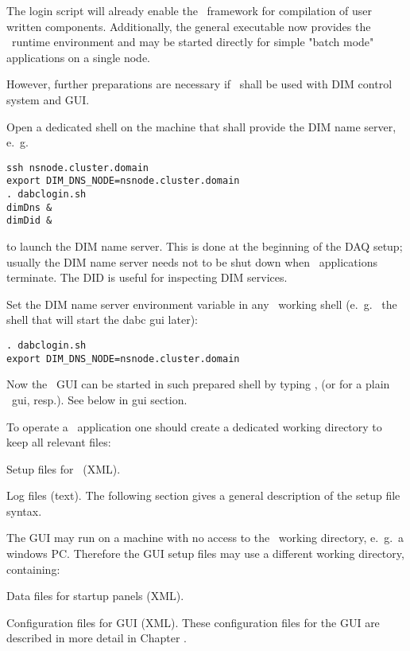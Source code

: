 The login script will already enable the \dabc\ framework for
compilation of user written components. Additionally, 
the general executable  now provides
the \dabc\ runtime environment and may be started directly 
for simple "batch mode" applications on a single node. 

However, further preparations are necessary if \dabc\ shall be used with
DIM control system and GUI.

\item Open a dedicated shell on the machine that shall provide the DIM name server,
e.~g.~ 
\begin{small}
\begin{verbatim}
ssh nsnode.cluster.domain
export DIM_DNS_NODE=nsnode.cluster.domain
. dabclogin.sh
dimDns &
dimDid &
\end{verbatim} 
\end{small}
to launch the DIM name server. This is done  at the beginning of
the DAQ setup; usually the DIM name server needs not to be shut down 
when \dabc\ applications terminate. The DID is useful for inspecting DIM services.

\item Set the DIM name server environment variable in any \dabc\ working shell (e.~g.~
the shell that will start the dabc gui later):
\begin{small}
\begin{verbatim}
. dabclogin.sh
export DIM_DNS_NODE=nsnode.cluster.domain
\end{verbatim} 
\end{small}

\item Now the \dabc\ GUI can be started in such prepared shell by typing , (or 
 for a plain \mbs\ gui, resp.). See below in gui section.  

\enum

\medskip
To operate a \dabc\ application one should create a dedicated 
working directory to keep all relevant files:
\bbul
\item Setup files for \dabc\ (XML).
\item Log files (text).
\ebul
The following section  
gives a general description of the setup file syntax.

The GUI may run on a machine with no access to the \dabc\ working directory,
e.~g.\ a windows PC.
Therefore the GUI setup files may use a different
working directory, containing: 
\bbul
\item Data files for startup panels (XML).
\item Configuration files for GUI (XML).
\ebul
These configuration files for the GUI are described in more detail 
in Chapter .

